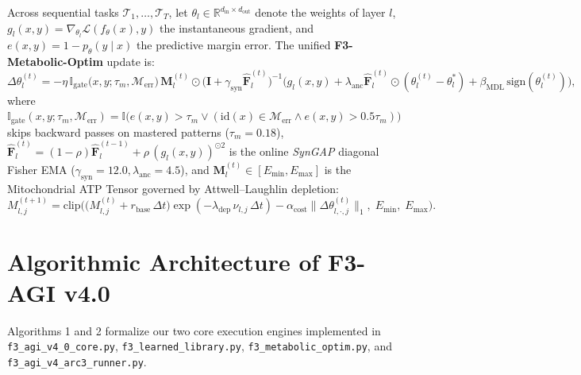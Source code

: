 \documentclass[10pt,a4paper]{article}
\begin{document}
Across sequential tasks $\mathcal{T}_1, \dots, \mathcal{T}_T$, let $\theta_l \in \mathbb{R}^{d_{\text{in}} \times d_{\text{out}}}$ denote the weights of layer $l$, $g_l(x, y) = \nabla_{\theta_l}\mathcal{L}(f_\theta(x), y)$ the instantaneous gradient, and $e(x, y) = 1 - p_\theta(y \mid x)$ the predictive margin error. The unified \textbf{F3-Metabolic-Optim} update is:
\begin{equation}
\label{eq:f3_metabolic_optim}
\Delta \theta_l^{(t)} = -\eta \, \mathbb{I}_{\text{gate}}\big(x, y; \tau_m, \mathcal{M}_{\text{err}}\big) \, \mathbf{M}_l^{(t)} \odot \big(\mathbf{I} + \gamma_{\text{syn}} \hat{\mathbf{F}}_l^{(t)}\big)^{-1} \Big( g_l(x, y) + \lambda_{\text{anc}} \hat{\mathbf{F}}_l^{(t)} \odot (\theta_l^{(t)} - \theta_l^{*}) + \beta_{\text{MDL}}\,\text{sign}(\theta_l^{(t)}) \Big),
\end{equation}
where $\mathbb{I}_{\text{gate}}(x, y; \tau_m, \mathcal{M}_{\text{err}}) = \mathbb{I}\big( e(x, y) > \tau_m \lor (\text{id}(x) \in \mathcal{M}_{\text{err}} \land e(x, y) > 0.5\tau_m) \big)$ skips backward passes on mastered patterns ($\tau_m = 0.18$), $\hat{\mathbf{F}}_l^{(t)} = (1 - \rho)\hat{\mathbf{F}}_l^{(t-1)} + \rho\,(g_l(x,y))^{\odot 2}$ is the online \emph{SynGAP} diagonal Fisher EMA ($\gamma_{\text{syn}} = 12.0, \lambda_{\text{anc}} = 4.5$), and $\mathbf{M}_l^{(t)} \in [E_{\min}, E_{\max}]$ is the Mitochondrial ATP Tensor governed by Attwell--Laughlin depletion:
\begin{equation}
M_{l,j}^{(t+1)} = \text{clip}\!\Big( \big(M_{l,j}^{(t)} + r_{\text{base}}\,\Delta t\big)\exp(-\lambda_{\text{dep}}\,\nu_{l,j}\,\Delta t) - \alpha_{\text{cost}}\|\Delta\theta_{l,\cdot,j}^{(t)}\|_1,\; E_{\min},\; E_{\max} \Big).
\end{equation}

\section{Algorithmic Architecture of F3-AGI v4.0}

Algorithms 1 and 2 formalize our two core execution engines implemented in \texttt{f3\_agi\_v4\_0\_core.py}, \texttt{f3\_learned\_library.py}, \texttt{f3\_metabolic\_optim.py}, and \texttt{f3\_agi\_v4\_arc3\_runner.py}.
\end{document}

